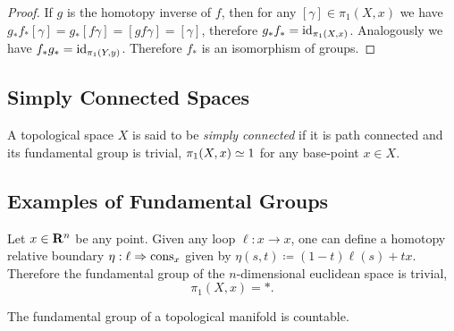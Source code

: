 \begin{proof}
    If \(g\) is the homotopy inverse of \(f\), then for any
    \([\gamma] \in \pi_1(X, x)\) we have
    \(g_{*}f_{*} [\gamma] = g_{*}[f \gamma] = [g f \gamma] = [\gamma]\), therefore
    \(g_{*} f_{*} = \operatorname{id}_{\pi_1(X, x)}\). Analogously we have
    \(f_{*} g_{*} = \operatorname{id}_{\pi_1(Y, y)}\). Therefore \(f_{*}\) is an isomorphism of
    groups.
\end{proof}

\subsection{Simply Connected Spaces}

\begin{definition}
    \label{def:simply-connected}
    A topological space \(X\) is said to be \emph{simply connected} if it is path
    connected and its fundamental group is
    trivial, \(\pi_1(X, x) \simeq 1\) for any base-point \(x \in X\).
\end{definition}


\subsection{Examples of Fundamental Groups}

\begin{example}
    \label{exp:euclidean-space-pi1-is-trivial}
    Let \(x \in \mathbf{R}^n\) be any point. Given any loop \(\ell: x \to x\), one can
    define a homotopy relative boundary \(\eta: \ell \Rightarrow \operatorname{cons}_x\) given by
    \(\eta(s, t) \coloneq (1 - t) \ell(s) + t x\). Therefore the fundamental group
    of the \(n\)-dimensional euclidean space is trivial,
    \[
        \pi_1(X, x) = *.
    \]
\end{example}

\begin{proposition}
    \label{prop:pi1-manifold-is-countable}
    The fundamental group of a topological manifold is countable.
\end{proposition}


